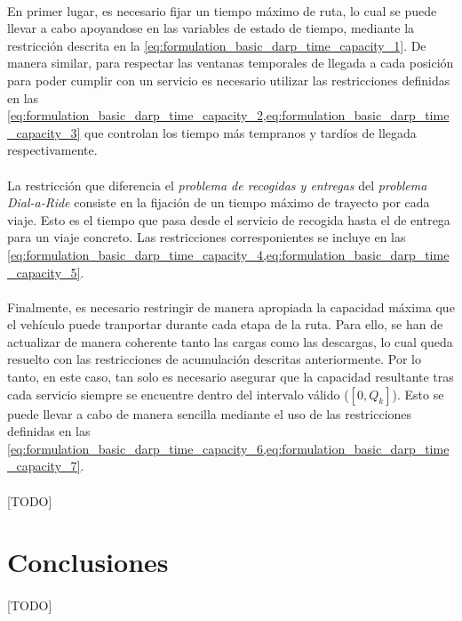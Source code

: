 \documentclass{subfiles}
\begin{document}
        \paragraph{}
        En primer lugar, es necesario fijar un  tiempo máximo de ruta, lo cual se puede llevar a cabo apoyandose en las variables de estado de tiempo, mediante la restricción descrita en la \cref{eq:formulation_basic_darp_time_capacity_1}. De manera similar, para respectar las ventanas temporales de llegada a cada posición para poder cumplir con un servicio es necesario utilizar las restricciones definidas en las \cref{eq:formulation_basic_darp_time_capacity_2,eq:formulation_basic_darp_time_capacity_3} que controlan los tiempo más tempranos y tardíos de llegada respectivamente.

        \paragraph{}
        La restricción que diferencia el \emph{problema de recogidas y entregas} del \emph{problema Dial-a-Ride} consiste en la fijación de un tiempo máximo de trayecto por cada viaje. Esto es el tiempo que pasa desde el servicio de recogida hasta el de entrega para un viaje concreto. Las restricciones corresponientes se incluye en las \cref{eq:formulation_basic_darp_time_capacity_4,eq:formulation_basic_darp_time_capacity_5}.

        \paragraph{}
        Finalmente, es necesario restringir de manera apropiada la capacidad máxima que el vehículo puede tranportar durante cada etapa de la ruta. Para ello, se han de actualizar de manera coherente tanto las cargas como las descargas, lo cual queda resuelto con las restricciones de acumulación descritas anteriormente. Por lo tanto, en este caso, tan solo es necesario asegurar que la capacidad resultante tras cada servicio siempre se encuentre dentro del intervalo válido ($[0, Q_{k}]$). Esto se puede llevar a cabo de manera sencilla mediante el uso de las restricciones definidas en las \cref{eq:formulation_basic_darp_time_capacity_6,eq:formulation_basic_darp_time_capacity_7}.

      \paragraph{}
      [TODO]

    \section{Conclusiones}
    \label{sec:formulation_conclusions}

      \paragraph{}
      [TODO]
\end{document}
